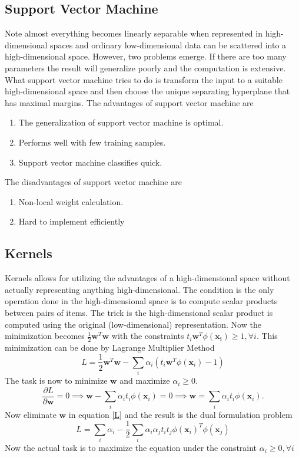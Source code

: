 \documentclass[12pt]{article}
\numberwithin{equation}{section}
\begin{document}
\subsection{Support Vector Machine}
Note almost everything becomes linearly separable when represented in high-dimensional spaces and ordinary low-dimensional data can be scattered into a high-dimensional space. However, two problems emerge. If there are too many parameters the result will generalize poorly and the computation is extensive. What support vector machine tries to do is transform the input to a suitable high-dimensional space and then choose the unique separating hyperplane that has maximal margins. The advantages of support vector machine are
\begin{enumerate}
    \item The generalization of support vector machine is optimal.
    \item Performs well with few training samples.
    \item Support vector machine classifies quick.
\end{enumerate}
The disadvantages of support vector machine are
\begin{enumerate}
    \item Non-local weight calculation.
    \item Hard to implement efficiently
\end{enumerate}
\subsection{Kernels}
Kernels allows for utilizing the advantages of a high-dimensional space without actually representing anything high-dimensional. The condition is the only operation done in the high-dimensional space is to compute scalar products between pairs of items. The trick is the high-dimensional scalar product is computed using the original (low-dimensional) representation. Now the minimization becomes $\frac{1}{2} \bm{w}^T \bm{w}$ with the constraints $t_i \bm{w}^T \phi (\bm{x_i}) \geq 1, \forall i$. This minimization can be done by Lagrange Multiplier Method 
\begin{equation}\label{L}
    L = \frac{1}{2} \bm{w}^T\bm{w} - \sum_i \alpha_i (t_i \bm{w}^T \phi (\bm{x}_i)-1)
\end{equation}
The task is now to minimize $\bm{w}$ and maximize $\alpha_i \geq 0$.
\begin{equation}
    \frac{\partial L}{\partial \bm{w}} = 0 \implies \bm{w} - \sum_i \alpha_i t_i \phi(\bm{x}_i) = 0 \implies \bm{w} = \sum_i \alpha_i t_i \phi (\bm{x}_i).
\end{equation}
Now eliminate $\bm{w}$ in equation \ref{L} and the result is the dual formulation problem
\begin{equation}\label{LPOWER}
    L = \sum_i \alpha_i - \frac{1}{2} \sum_i \alpha_i \alpha_j t_i t_j \phi (\bm{x}_i)^T \phi (\bm{x}_j)
\end{equation}
Now the actual task is to maximize the equation \label{LPOWER} under the constraint $\alpha_i \geq 0, \forall i$ 
\end{document}
